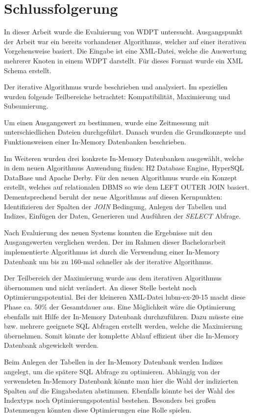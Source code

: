 \documentclass[draft,final]{vutinfth} %
\begin{document}
\chapter{Schlussfolgerung}


In dieser Arbeit wurde die Evaluierung von WDPT untersucht. Ausgangspunkt der Arbeit war ein bereits vorhandener Algorithmus, welcher auf einer iterativen Vorgehensweise basiert.
Die Eingabe ist eine XML-Datei, welche die Auswertung mehrerer Knoten in einem WDPT darstellt. Für dieses Format wurde ein XML Schema erstellt.

Der iterative Algorithmus wurde beschrieben und analysiert. Im speziellen wurden folgende Teilbereiche betrachtet: Kompatibilität, Maximierung und Subsumierung.

Um einen Ausgangswert zu bestimmen, wurde eine Zeitmessung mit unterschiedlichen Dateien durchgeführt. 
Danach wurden die Grundkonzepte und Funktionsweisen einer In-Memory Datenbanken beschrieben. 

Im Weiteren wurden drei konkrete In-Memory Datenbanken ausgewählt, welche in dem neuen Algorithmus Anwendung finden: H2 Database Engine, HyperSQL DataBase und Apache Derby.
Für den neuen Algorithmus wurde ein Konzept erstellt, welches auf relationalen DBMS so wie dem LEFT OUTER JOIN basiert. 
Dementsprechend beruht der neue Algorithmus auf diesen Kernpunkten: Identifizieren der Spalten der \textit{JOIN} Bedingung, Anlegen der Tabellen und Indizes, Einfügen der Daten, Generieren und Ausführen der \textit{SELECT} Abfrage.

Nach Evaluierung des neuen Systems konnten die Ergebnisse mit den Ausgangswerten verglichen werden. Der im Rahmen dieser Bachelorarbeit implementierte Algorithmus ist durch die Verwendung einer In-Memory Datenbank um bis zu 160-mal schneller als der iterative Algorithmus.
   
Der Teilbereich der Maximierung wurde aus dem iterativen Algorithmus übernommen und nicht verändert. An dieser Stelle besteht noch Optimierungspotential. Bei der kleineren XML-Datei lubm-ex-20-15 macht diese Phase ca. 50\% der Gesamtdauer aus. Eine Möglichkeit wäre die Optimierung ebenfalls mit Hilfe der In-Memory Datenbank durchzuführen. Dazu müsste eine bzw. mehrere geeignete SQL Abfragen erstellt werden, welche die Maximierung übernehmen. Somit könnte der komplette Ablauf effizient über die In-Memory Datenbank abgewickelt werden.

Beim Anlegen der Tabellen in der In-Memory Datenbank werden Indizes angelegt, um die spätere SQL Abfrage zu optimieren. Abhängig von der verwendeten In-Memory Datenbank könnte man hier die Wahl der indizierten Spalten auf die Eingabedaten abstimmen. Ebenfalls könnte bei der Wahl des Indextyps noch Optimierungspotential bestehen. Besonders bei gro\ss en Datenmengen könnten diese Optimierungen eine Rolle spielen.
\end{document}
